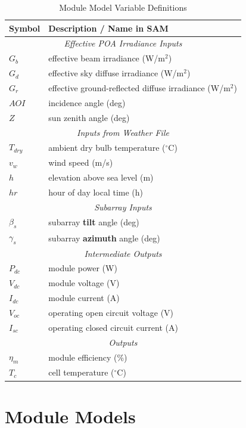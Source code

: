 \documentclass[12pt,letterpaper]{article}
\newcommand\AOI{\ensuremath{\mathit{AOI}}}
\begin{document}
\begin{table}
\begin{center}
\caption{Module Model Variable Definitions}
\begin{tabular}{ll}
\midrule
Symbol & Description / \textbf{Name in SAM}\\
\midrule
\multicolumn{2}{c}{\textit{Effective POA Irradiance Inputs}}\\
$G_b$ & effective beam irradiance (W/m$^2$)\\
$G_d$ & effective sky diffuse irradiance (W/m$^2$) \\
$G_r$ & effective ground-reflected diffuse irradiance (W/m$^2$)  \\
$\AOI$ & incidence angle (deg)\\
$Z$ & sun zenith angle (deg)\\
\midrule
\multicolumn{2}{c}{\textit{Inputs from Weather File}}\\
$T_{dry}$ & ambient dry bulb temperature ($^\circ$C) \\
$v_w$ & wind speed (m/s)\\
$h$ & elevation above sea level (m)\\
$\mathit{hr}$ & hour of day local time (h)\\
\midrule
\multicolumn{2}{c}{\textit{Subarray Inputs}}\\
$\beta_s$ & subarray \textbf{tilt} angle (deg) \\
$\gamma_s$ & subarray \textbf{azimuth} angle (deg)\\
\midrule
\multicolumn{2}{c}{\textit{Intermediate Outputs}}\\
$P_{dc}$ & module power (W)\\
$V_{dc}$ & module voltage (V)\\
$I_{dc}$ & module current  (A)\\
$V_{oc}$ & operating open circuit voltage (V) \\
$I_{sc}$ & operating closed circuit current (A)\\
\midrule
\multicolumn{2}{c}{\textit{Outputs}}\\
$\eta_m$ & module efficiency (\%)\\
$T_c$ & cell temperature ($^\circ$C)\\
\midrule
\end{tabular}
\label{tab-modulevars}
\end{center}
\end{table}

\section{Module Models}\label{sec-moduleoptions}
\end{document}
